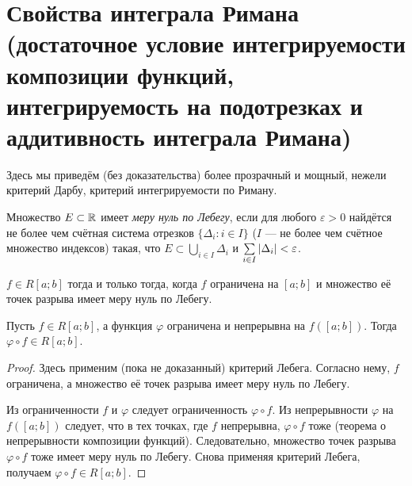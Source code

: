 \section{Свойства интеграла Римана (достаточное условие интегрируемости композиции функций, интегрируемость на подотрезках и аддитивность интеграла Римана)}

Здесь мы приведём (без доказательства) более прозрачный и мощный, нежели критерий Дарбу, критерий интегрируемости по Риману.

\begin{definition}
    Множество $E \subset \mathbb{R}$ имеет \textit{меру нуль по Лебегу}, если для любого $\varepsilon > 0$ найдётся не более чем счётная система отрезков $\{\Delta_i : i \in I\}$ ($I$ --- не более чем счётное множество индексов) такая, что $E \subset \bigcup\limits_{i \in I}\Delta_i$ и $\sum\limits_{i \in I}\left\lvert\Delta_i\right\rvert < \varepsilon$.
\end{definition}

\begin{theorem}
    $f \in R[a; b]$ тогда и только тогда, когда $f$ ограничена на $[a; b]$ и множество её точек разрыва имеет меру нуль по Лебегу.
\end{theorem}

\begin{theorem}
    Пусть $f \in R[a; b]$, а функция $\varphi$ ограничена и непрерывна на $f([a; b])$. Тогда $\varphi \circ f \in R[a; b]$.
\end{theorem}

\begin{proof}
    Здесь применим (пока не доказанный) критерий Лебега. Согласно нему, $f$ ограничена, а множество её точек разрыва имеет меру нуль по Лебегу.

    Из ограниченности $f$ и $\varphi$ следует ограниченность $\varphi \circ f$. Из непрерывности $\varphi$ на $f([a; b])$ следует, что в тех точках, где $f$ непрерывна, $\varphi \circ f$ тоже (теорема о непрерывности композиции функций). Следовательно, множество точек разрыва $\varphi \circ f$ тоже имеет меру нуль по Лебегу. Снова применяя критерий Лебега, получаем $\varphi \circ f \in R[a; b]$.
\end{proof}

